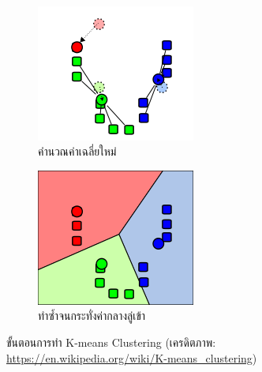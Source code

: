 \begin{figure}[htbp]
\begin{subfigure}{0.5\textwidth}
        \label{fig:k_means_step2}
    \end{subfigure}
    \\
    \vspace{1em}
    \begin{subfigure}{0.5\textwidth}
        \centering
        \includegraphics[width=0.9\linewidth]{fig/k-means-step3.png}
        \caption{คำนวณค่าเฉลี่ยใหม่}
        \label{fig:k_means_step3}
    \end{subfigure}%
    \begin{subfigure}{0.5\textwidth}
        \centering
        \includegraphics[width=0.9\linewidth]{fig/k-means-step4.png}
        \caption{ทำซ้ำจนกระทั่งค่ากลางลู่เข้า}
        \label{fig:k_means_step4}
    \end{subfigure}
    \caption{ขั้นตอนการทำ K-means Clustering (เครดิตภาพ: \url{https://en.wikipedia.org/wiki/K-means_clustering})}
    \label{fig:k_means}
\end{figure}
 
